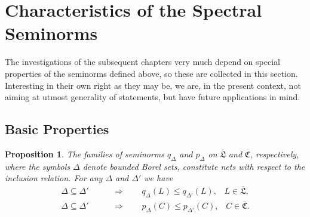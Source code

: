 \documentclass[11pt,twoside,openright]{report}
\theoremstyle{definition}
\theoremstyle{plain}
\newtheorem{Pro}[Def]{Proposition}
\theoremstyle{remark}
\theoremstyle{assumption}
\newcommand{\pD}{p_\Delta}
\newcommand{\pDx}[1]{p_\Delta ( #1 )}
\newcommand{\pDprimex}[1]{p_{\Delta'} ( #1 )}
\newcommand{\qD}{q_\Delta}
\newcommand{\qDx}[1]{q_\Delta ( #1 )}
\newcommand{\qDprimex}[1]{q_{\Delta'} ( #1 )}
\newcommand{\Cfrakbar}{\overline{\mathfrak{C}}}
\newcommand{\Lfrakbar}{\overline{\mathfrak{L}}}
\begin{document}
\section{Characteristics of the Spectral Seminorms}

The investigations of the subsequent chapters very much depend on
special properties of the seminorms defined above, so these are
collected in this section. Interesting in their own right as they may
be, we are, in the present context, not aiming at utmost generality of
statements, but have future applications in mind.

\subsection{Basic Properties}

\begin{Pro}
  \label{Pro-seminorm-nets}
  The families of seminorms $\qD$ and $\pD$ on $\Lfrakbar$ and
  $\Cfrakbar$, respectively, where the symbols $\Delta$ denote bounded
  Borel sets, constitute nets with respect to the inclusion
  relation. For any $\Delta$ and $\Delta'$ we have
  \begin{align*}
    \Delta \subseteq \Delta' \qquad & \Rightarrow \qquad \qDx{L}
    \leqslant \qDprimex{L} \text{,} \quad L \in \Lfrakbar \text{,} \\
    \Delta \subseteq \Delta' \qquad & \Rightarrow \qquad \pDx{C}
    \leqslant \pDprimex{C} \text{,} \quad C \in \Cfrakbar \text{.} 
  \end{align*}
\end{Pro}
\end{document}
